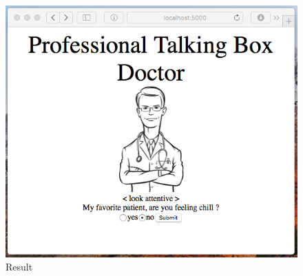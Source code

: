 \documentclass[11pt]{article}
\begin{document}
\begin{figure}[H]
    \centering
  \includegraphics[scale = 0.4]{report_img/ScreenShot2.png}
  \caption{Result}
  \label{ss3}
\end{figure}
\end{document}
